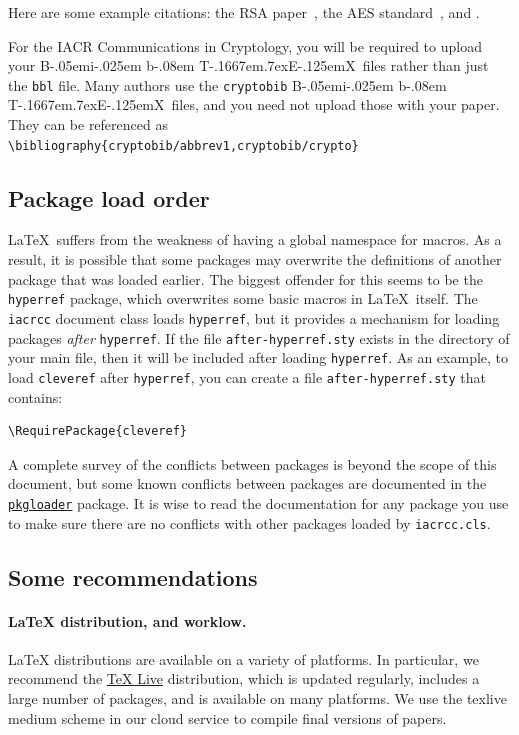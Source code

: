 \documentclass{iacrcc}
\def\BibTeX{{\rm B\kern-.05em{\sc i\kern-.025em b}\kern-.08em
    T\kern-.1667em\lower.7ex\hbox{E}\kern-.125emX}}
\begin{document}
Here are some example citations: the RSA paper~\cite{RSA78}, the AES
standard~\cite{AES-FIPS}, and \cite{DBLP:conf/crypto/Kocher96}.

For the IACR Communications in Cryptology, you will be required to
upload your \BibTeX\ files rather than just the \texttt{bbl} file.
Many authors use the \texttt{cryptobib} \BibTeX\ files, and you need
not upload those with your paper. They can be referenced as
\texttt{\textbackslash bibliography\{cryptobib/abbrev1,cryptobib/crypto\}}

\subsection{Package load order}\label{sec:loadorder}

\LaTeX\ suffers from the weakness of having a global namespace for
macros. As a result, it is possible that some packages may overwrite
the definitions of another package that was loaded earlier. The
biggest offender for this seems to be the \texttt{hyperref} package,
which overwrites some basic macros in \LaTeX\ itself. The
\texttt{iacrcc} document class loads \texttt{hyperref}, but it
provides a mechanism for loading packages \emph{after} \texttt{hyperref}. If
the file \texttt{after-hyperref.sty} exists in the directory of your
main file, then it will be included after loading \texttt{hyperref}.
As an example, to load \texttt{cleveref} after \texttt{hyperref}, you
can create a file \texttt{after-hyperref.sty} that contains:
\begin{verbatim}
\RequirePackage{cleveref}
\end{verbatim}
A complete survey of the conflicts between packages is beyond the scope of this document, but
some known conflicts between packages are documented in the
\href{https://github.com/mhelvens/latex-pkgloader/blob/master/pkgloader-recommended.sty}{\texttt{pkgloader}}
package. It is wise to read the documentation for any package you use to make sure
there are no conflicts with other packages loaded by \texttt{iacrcc.cls}.

\subsection{Some recommendations}\label{sec:options}

\paragraph{\LaTeX{} distribution, and worklow.}  \LaTeX{}
distributions are available on a variety of platforms.  In particular,
we recommend the \href{https://www.tug.org/texlive/}{TeX Live}
distribution, which is updated regularly, includes a large number of
packages, and is available on many platforms. We use the texlive medium
scheme in our cloud service to compile final versions of papers.
\end{document}

